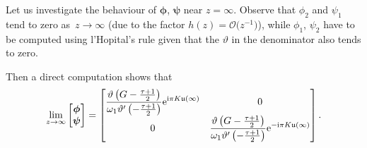 \documentclass[pdftex]{sigma}
\numberwithin{equation}{section}
\theoremstyle{definition}
\def\Abel{\mathfrak u}
\def\le{\left}
\def \bs{\boldsymbol}
\def\ri{\right}
\begin{document}
Let us investigate the behaviour of $\bs \phi$, $\bs \psi$ near $z=\infty$.
Observe that $\phi_2$ and $\psi_1$ tend to zero as~${z\to\infty}$ \big(due to the factor $h(z) = \mathcal O\bigl(z^{-1}\bigr)$\big), while $\phi_1$, $\psi_2$ have to be computed using l'Hopital's rule given that the $\vartheta$ in the denominator also tends to zero.

Then a direct computation shows that
\[
\lim_{z\to\infty} \begin{bmatrix}
\bs\phi\\
\bs \psi\end{bmatrix} =
\begin{bmatrix} \displaystyle \frac {\vartheta\le(G- \frac {\tau + 1}2\ri)}{\omega_1 \vartheta'\le(-\frac {\tau + 1}2\ri)}{\rm e}^{{\rm i}\pi K\Abel(\infty)} & 0
\\0 & \displaystyle \frac {\vartheta\le(G- \frac {\tau + 1}2\ri)}{\omega_1 \vartheta'\le(-\frac {\tau + 1}2\ri)}{\rm e}^{-{\rm i}\pi K\Abel(\infty)}
\end{bmatrix}.
\]
\end{document}
